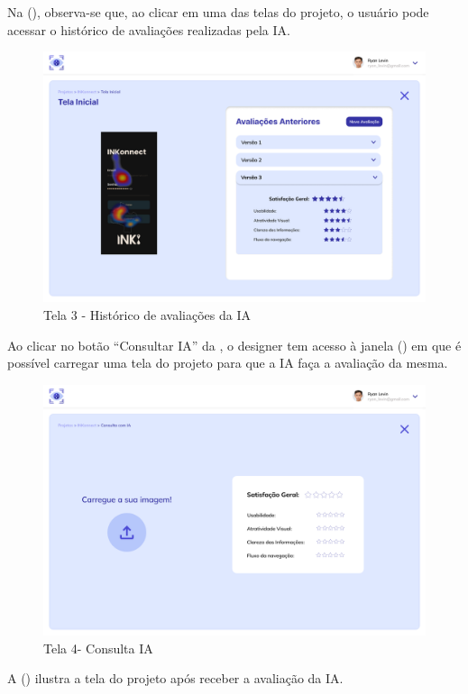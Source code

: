 Na (), observa-se que, ao clicar em uma das telas do projeto, o usuário pode acessar o histórico de avaliações realizadas pela IA.

\begin{figure}[H]
    \centering
    \caption{Tela 3 - Histórico de avaliações da IA}%
    \label{fig:pg-tela3}
    \includegraphics[width=0.72\linewidth]{Illustrations/tela3.png}
\end{figure}

Ao clicar no botão “Consultar IA” da , o designer tem acesso à janela () em que é possível carregar uma tela do projeto para que a IA faça a avaliação da mesma.

\begin{figure}[H]
    \centering
    \caption{Tela 4- Consulta IA}%
    \label{fig:pg-tela4}
    \includegraphics[width=0.72\linewidth]{Illustrations/tela4.png}
\end{figure}

A () ilustra a tela do projeto após receber a avaliação da IA.

